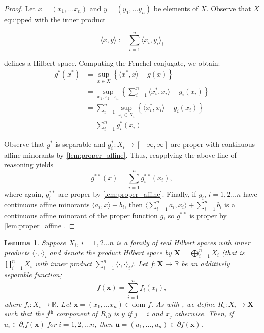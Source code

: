\documentclass[11pt]{article}
\newtheorem{lemma}{Lemma}
\newcommand\inner[2]{\langle #1, #2 \rangle}
\newcommand{\R}{\mathbb{R}}
\begin{document}
	\begin{proof}
		Let $x = (x_1, \ldots x_n)$ and $y = (y_1, \ldots y_n)$ be elements of $X$. Observe that $X$ equipped with the inner product 
		
		\[	\langle x, y\rangle := \sum_{i=1}^{n} \langle x_{i}, y_{i}\rangle_{i}
				\]
				
		\noindent defines a Hilbert space. 	Computing the Fenchel conjugate, we obtain:
		\begin{align*}
			g^{*}(x^{*}) 
			& = \sup_{x\in X}\left\{ 
									\langle x^*, x\rangle - g(x)
												\right\} \\
			& = \sup_{x_1,x_2\ldots x_n} \left\{
										\sum_{i=1}^{n} \langle x^{*}_{i}, x_i\rangle - g_{i}(x_i)
												\right\}	\\
			& = \sum_{i=1}^{n}	\sup_{x_i\in X_i} \left\{\langle x^{*}_{i}, x_i\rangle - g_{i}(x_i)\right\} \\
			& = \sum_{i=1}^{n} g_{i}^{*}(x_i)					
			\end{align*}
			
			\noindent Observe that $g^{*}$ is separable and $g_{i}^{*}:X_{i}\to[-\infty, \infty]$ are proper with continuous affine minorants by \autoref{lem:proper_affine}. Thus, reapplying the above line of reasoning yields 
			\[	g^{**}(x) = \sum_{i=1}^{n} g_{i}^{**}(x_i),
			\]
			where again, $g^{**}_{i}$ are proper by \autoref{lem:proper_affine}. Finally, if $g_{i}$, $i=1,2\ldots n$ have continuous affine minorants $\langle a_{i}, x\rangle + b_{i}$, then $\langle \sum_{i=1}^{n}a_i, x_i\rangle + \sum_{i=1}^{n} b_{i}$ is a continuous affine minorant of the proper function $g$, so $g^{**}$ is proper by \autoref{lem:proper_affine}.
		\end{proof}
		\printbibliography
		\begin{lemma}
			 Suppose $X_i$, $i=1,2\ldots n$ is a family of real Hilbert spaces with inner products $\inner{\cdot}{\cdot}_i$ and denote the product Hilbert space by $\bm{X}=\bigoplus_{i=1}^{n}X_i$ (that is $\prod_{i=1}^{n}X_i$ with inner product $\sum_{i=1}^{n}\inner{\cdot}{\cdot}_i$). Let $f:\bm{X}\to\R$ be an additively separable function;
			\[  f(\bm{x}) = \sum_{i=1}^{n}f_{i}(x_i),
			\]
			where $f_i:X_i\to\R$. Let $\bm{x}=(x_1, \ldots x_n)\in\text{dom }f$. As with \cite{Bauschke2010}, we define $R_i:X_i\to \bm{X}$ such that the j$^{\text{th}}$ component of $R_i y$ is $y$ if $j=i$ and $x_j$ otherwise. Then, if $u_i\in\partial_i f(\bm{x})$ for $i=1,2,\ldots n$, then $\bm{u}=(u_1, \ldots, u_n)\in\partial f(\bm{x})$.
			\end{lemma}
\end{document}
